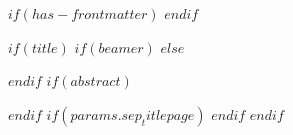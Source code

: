 $if(has-frontmatter)$
\frontmatter
$endif$

$if(title)$
$if(beamer)$
\frame{\titlepage}
$else$
\maketitle
$endif$
$if(abstract)$
\begin{abstract}
$abstract$
\end{abstract}
$endif$
$if(params.sep_titlepage)$
\newpage
$endif$
$endif$

